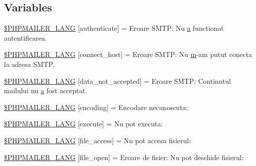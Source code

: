 \subsection*{Variables}
\begin{DoxyCompactItemize}
\item 
\hyperlink{phpmailer_8lang-ro_8php_a2cb33073c989b85580748e331ed8b4aa}{\$\+P\+H\+P\+M\+A\+I\+L\+E\+R\+\_\+\+L\+A\+NG} \mbox{[}\textquotesingle{}authenticate\textquotesingle{}\mbox{]} = \textquotesingle{}Eroare S\+M\+T\+P\+: Nu \hyperlink{_chart_8min_8js_aef3b685c08bc6c76c8e729bd0e93901d}{a} functionat autentificarea.\textquotesingle{}
\item 
\hyperlink{phpmailer_8lang-ro_8php_a2ee0cc637a06b96e45600db31c6799ee}{\$\+P\+H\+P\+M\+A\+I\+L\+E\+R\+\_\+\+L\+A\+NG} \mbox{[}\textquotesingle{}connect\+\_\+host\textquotesingle{}\mbox{]} = \textquotesingle{}Eroare S\+M\+T\+P\+: Nu \hyperlink{_chart_8min_8js_a9e77e016b2928d7dcb493b89a0c9dc32}{m}-\/am putut conecta la adresa S\+M\+T\+P.\textquotesingle{}
\item 
\hyperlink{phpmailer_8lang-ro_8php_a814c6b191205d2361b3233e9c9d6fda5}{\$\+P\+H\+P\+M\+A\+I\+L\+E\+R\+\_\+\+L\+A\+NG} \mbox{[}\textquotesingle{}data\+\_\+not\+\_\+accepted\textquotesingle{}\mbox{]} = \textquotesingle{}Eroare S\+M\+T\+P\+: Continutul mailului nu \hyperlink{_chart_8min_8js_aef3b685c08bc6c76c8e729bd0e93901d}{a} fost acceptat.\textquotesingle{}
\item 
\hyperlink{phpmailer_8lang-ro_8php_a817f7283f3d54c970a0c10305cc668cc}{\$\+P\+H\+P\+M\+A\+I\+L\+E\+R\+\_\+\+L\+A\+NG} \mbox{[}\textquotesingle{}encoding\textquotesingle{}\mbox{]} = \textquotesingle{}Encodare necunoscuta\+: \textquotesingle{}
\item 
\hyperlink{phpmailer_8lang-ro_8php_a668217a9563a168f30f2a8548b6ed5a9}{\$\+P\+H\+P\+M\+A\+I\+L\+E\+R\+\_\+\+L\+A\+NG} \mbox{[}\textquotesingle{}execute\textquotesingle{}\mbox{]} = \textquotesingle{}Nu pot executa\+: \textquotesingle{}
\item 
\hyperlink{phpmailer_8lang-ro_8php_a7e83349023b856ef9e5c46e30ae6d51e}{\$\+P\+H\+P\+M\+A\+I\+L\+E\+R\+\_\+\+L\+A\+NG} \mbox{[}\textquotesingle{}file\+\_\+access\textquotesingle{}\mbox{]} = \textquotesingle{}Nu pot accesa fisierul\+: \textquotesingle{}
\item 
\hyperlink{phpmailer_8lang-ro_8php_a28d1a6517bf4c942a0ddd506188ad2e0}{\$\+P\+H\+P\+M\+A\+I\+L\+E\+R\+\_\+\+L\+A\+NG} \mbox{[}\textquotesingle{}file\+\_\+open\textquotesingle{}\mbox{]} = \textquotesingle{}Eroare de fisier\+: Nu pot deschide fisierul\+: \textquotesingle{}

\end{DoxyCompactItemize}
